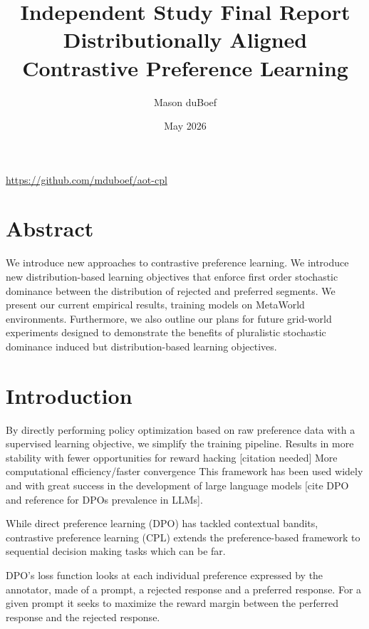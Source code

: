 \documentclass[11pt]{article}
\title{Independent Study Final Report \\ \large Distributionally Aligned Contrastive Preference Learning}
\author{Mason duBoef}
\date{May 2026}
\begin{document}
\maketitle

\begin{center}
    \url{https://github.com/mduboef/aot-cpl}
\end{center}

\section*{Abstract}

We introduce new approaches to contrastive preference learning. We introduce new distribution-based learning objectives that enforce first order stochastic dominance between the distribution of rejected and preferred segments. We present our current empirical results, training models on MetaWorld environments. Furthermore, we also outline our plans for future grid-world experiments designed to demonstrate the benefits of pluralistic stochastic dominance induced but distribution-based learning objectives.

\section{Introduction}

        By directly performing policy optimization based on raw preference data with a supervised learning objective, we simplify the training pipeline.
        Results in more stability with fewer opportunities for reward hacking [citation needed]
        More computational efficiency/faster convergence
        This framework has been used widely and with great success in the development of large language models [cite DPO and reference for DPOs prevalence in LLMs].



    While direct preference learning (DPO) has tackled contextual bandits, contrastive preference learning (CPL) extends the preference-based framework to sequential decision making tasks which can be far.


    DPO's loss function looks at each individual preference expressed by the annotator, made of a prompt, a rejected response and a preferred response. For a given prompt it seeks to maximize the reward margin between the perferred response and the rejected response.
\end{document}
